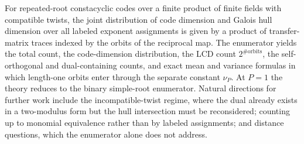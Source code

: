 \documentclass[10pt,journal,draftclsnofoot,onecolumn]{IEEEtran}
\theoremstyle{definition}
\theoremstyle{remark}
\begin{document}
For repeated-root constacyclic codes over a finite product of finite
fields with compatible twists, the joint distribution of code dimension and
Galois hull dimension over all labeled exponent assignments is given by
a product of transfer-matrix traces indexed by the orbits of the
reciprocal map. The enumerator yields the total count, the
code-dimension distribution, the LCD count \(2^{\#\mathrm{orbits}}\), the
self-orthogonal and dual-containing counts, and exact mean and variance
formulas in which length-one orbits enter through the separate constant
\(\nu_P\). At \(P=1\) the theory reduces to the binary simple-root
enumerator. Natural directions for further work include the
incompatible-twist regime, where the dual already exists in a
two-modulus form but the hull intersection must be reconsidered;
counting up to monomial equivalence rather than by labeled assignments;
and distance questions, which the enumerator alone does not address.
\end{document}

